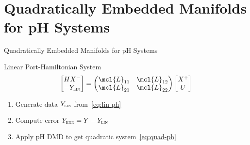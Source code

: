 \section{Quadratically Embedded Manifolds for pH Systems}

\begin{frame}{Quadratically Embedded Manifolds for pH Systems}
    \begin{block}{Linear Port-Hamiltonian System}
        \begin{equation}\label{eq:lin-ph}
            \begin{bmatrix}
                H X^- \\
                - Y_{\textsc{lin}}
            \end{bmatrix} = \begin{pmatrix}
                \mcl{L}_{11} & \mcl{L}_{12} \\
                \mcl{L}_{21} & \mcl{L}_{22}
            \end{pmatrix} \begin{bmatrix}
                X^+ \\
                U
            \end{bmatrix}
        \end{equation}
    \end{block}

    \begin{enumerate}
        \item<2-> Generate data $Y_{\textsc{lin}}$ from~\eqref{eq:lin-ph}
        \item<3-> Compute error $Y_{\textsc{err}} = Y - Y_{\textsc{lin}}$
        \item<4-> Apply pH DMD to get quadratic system~\eqref{eq:quad-ph}
    \end{enumerate}

\end{frame}

